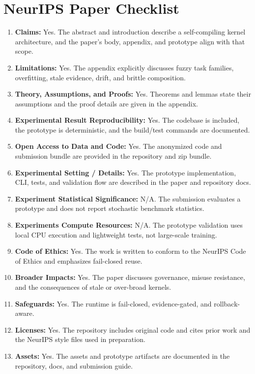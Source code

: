 \documentclass{article}
\begin{document}
\section*{NeurIPS Paper Checklist}
\begin{enumerate}[leftmargin=1.2em]
\item \textbf{Claims:} Yes. The abstract and introduction describe a self-compiling kernel architecture, and the paper’s body, appendix, and prototype align with that scope.
\item \textbf{Limitations:} Yes. The appendix explicitly discusses fuzzy task families, overfitting, stale evidence, drift, and brittle composition.
\item \textbf{Theory, Assumptions, and Proofs:} Yes. Theorems and lemmas state their assumptions and the proof details are given in the appendix.
\item \textbf{Experimental Result Reproducibility:} Yes. The codebase is included, the prototype is deterministic, and the build/test commands are documented.
\item \textbf{Open Access to Data and Code:} Yes. The anonymized code and submission bundle are provided in the repository and zip bundle.
\item \textbf{Experimental Setting / Details:} Yes. The prototype implementation, CLI, tests, and validation flow are described in the paper and repository docs.
\item \textbf{Experiment Statistical Significance:} N/A. The submission evaluates a prototype and does not report stochastic benchmark statistics.
\item \textbf{Experiments Compute Resources:} N/A. The prototype validation uses local CPU execution and lightweight tests, not large-scale training.
\item \textbf{Code of Ethics:} Yes. The work is written to conform to the NeurIPS Code of Ethics and emphasizes fail-closed reuse.
\item \textbf{Broader Impacts:} Yes. The paper discusses governance, misuse resistance, and the consequences of stale or over-broad kernels.
\item \textbf{Safeguards:} Yes. The runtime is fail-closed, evidence-gated, and rollback-aware.
\item \textbf{Licenses:} Yes. The repository includes original code and cites prior work and the NeurIPS style files used in preparation.
\item \textbf{Assets:} Yes. The assets and prototype artifacts are documented in the repository, docs, and submission guide.
\end{enumerate}
\end{document}
